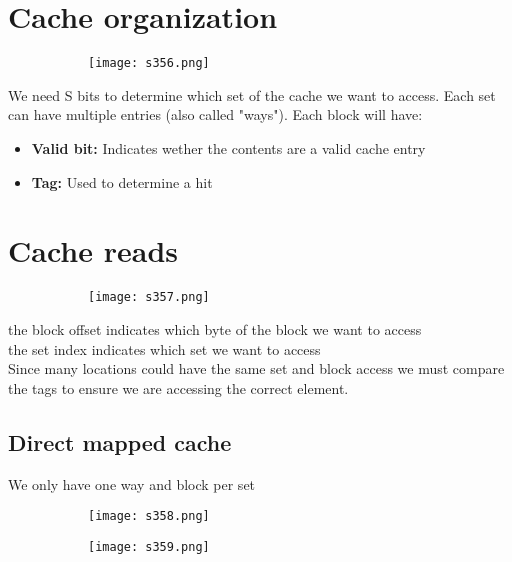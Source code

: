 \documentclass[8pt]{extreport}
\begin{document}
\section{Cache organization}
\begin{figure}[H]
\begin{subfigure}[b]{0.4\linewidth}
\texttt{[image: s356.png]}
\end{subfigure}
\end{figure}
We need S bits to determine which set of the cache we want to access. Each set can have multiple entries (also called "ways"). Each block will have:
\begin{itemize}
\item \textbf{Valid bit:} Indicates wether the contents are a valid cache entry
\item \textbf{Tag:} Used to determine a hit 
\end{itemize}

\section{Cache reads}
\begin{figure}[H]
\begin{subfigure}[b]{0.4\linewidth}
\texttt{[image: s357.png]}
\end{subfigure}
\end{figure}
the block offset indicates which byte of the block we want to access\\
the set index indicates which set we want to access\\
Since many locations could have the same set and block access we must compare the tags to ensure we are accessing the correct element.

\subsection{Direct mapped cache}
We only have one way and block per set
\begin{figure}[H]
\begin{subfigure}[b]{0.4\linewidth}
\texttt{[image: s358.png]}
\end{subfigure}
\begin{subfigure}[b]{0.4\linewidth}
\texttt{[image: s359.png]}
\end{subfigure}
\end{figure}
\end{document}
